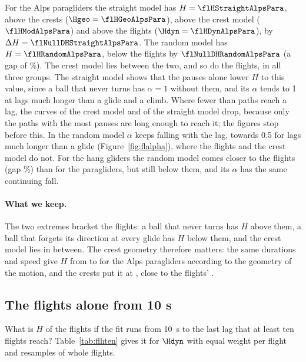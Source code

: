 For the Alps paragliders the straight model has $H = \flHStraightAlpsPara$, above the crests ($\Hgeo = \flHGeoAlpsPara$),
above the crest model ($\flHModAlpsPara$) and above the flights ($\Hdyn = \flHDynAlpsPara$), by $\Delta H =
\flNullDHStraightAlpsPara$. The random model has $H = \flHRandomAlpsPara$, below the flights by $\flNullDHRandomAlpsPara$
(a gap of \flNullGapRandomAlpsPara\%). The crest model lies between the two, and so do the flights, in all three groups. The
straight model shows that the pauses alone lower $H$ to this value, since a ball that never turns has $\alpha = 1$ without
them, and its $\alpha$ tends to 1 at lags much longer than a glide and a climb. Where fewer than \flMinRows{} paths reach a lag, the
curves of the crest model and of the straight model drop, because only the paths with the most pauses are long enough to reach
it; the figures stop before this. In the random model $\alpha$ keeps falling with the lag, towards 0.5 for lags much longer than a glide
(Figure~\ref{fig:flalpha}), where the flights and the crest model do not. For the hang gliders the random model comes
closer to the flights (gap \flNullGapRandomAlpsHang\%) than for the paragliders, but still below them, and its $\alpha$ has the
same continuing fall.

\paragraph{What we keep.} The two extremes bracket the flights: a ball that never turns has $H$ above them, a ball that
forgets its direction at every glide has $H$ below them, and the crest model lies in between. The crest geometry
therefore matters: the same durations and speed give $H$ from \flHRandomAlpsPara{} to \flHStraightAlpsPara{} for the Alps
paragliders according to the geometry of the motion, and the crests put it at \flHModAlpsPara, close to the flights' \flHDynAlpsPara.

\subsection{The flights alone from 10 s}\label{sec:flhten}

What is $H$ of the flights if the fit runs from 10~s to the last lag that at least ten flights reach?
Table~\ref{tab:flhten} gives it for $\Hdyn$ with equal weight per flight and \flNBoot{} resamples of whole flights.

\begin{table}[t]
\centering
\caption{$H$ of the flights (dyn) fitted from 10~s to the last lag with at least ten flights, with 95\% intervals.}
\label{tab:flhten}
\small

\end{table}

